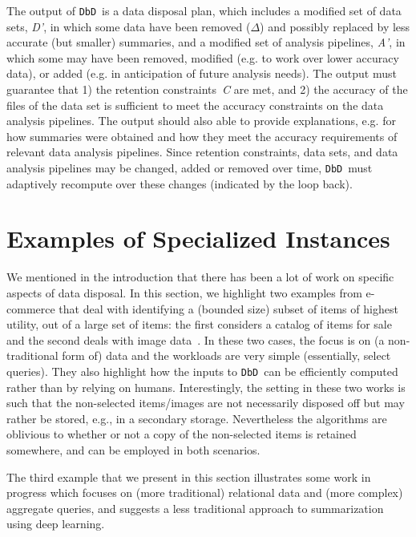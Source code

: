 \documentclass[11pt,dvipdfm]{article}
\newcommand{\grid}{{\tt DbD}}
\begin{document}
The output of \grid\ is a 
data disposal plan, which includes 
a modified set of data sets, \textit{D'}, in which some data have been removed ($\Delta$) and possibly replaced by less accurate (but smaller) summaries, and a modified set of analysis pipelines, 
\textit{A'}, in which some may have been removed,  modified (e.g. to work over lower accuracy data), or added (e.g. in anticipation of future analysis needs).  The output must guarantee that 1) the retention constraints~\textit{C} are met, and 2) the accuracy of the files of the data set is sufficient to meet the accuracy constraints on the data analysis pipelines.  The output should also able to provide explanations, e.g. for how summaries were obtained and how they meet the accuracy requirements of relevant data analysis pipelines. Since retention constraints, data sets, and data analysis pipelines may be changed, added or removed over time, \grid\ must adaptively recompute over these changes (indicated by the loop back).




\section{Examples of Specialized Instances}
\label{sec: ex}

We mentioned in the introduction that there has been a lot of work on specific aspects of data disposal.  In this section, we highlight two examples from e-commerce that deal with identifying a (bounded size) subset of items of highest utility, out of a large set of items: the first considers a catalog of items for sale~\cite{EDBT20} and the second deals with image data~\cite{SIGMOD-demo}.  In these two cases, the focus is on (a non-traditional form of) data and the workloads are very simple (essentially, select queries).  They also highlight how the inputs to \grid\ can be efficiently computed rather than by relying on humans. Interestingly, the setting in these two works is such that the non-selected items/images are not necessarily disposed off but may rather be stored, e.g., in a secondary storage. Nevertheless the algorithms are oblivious to whether or not a copy of the non-selected items is retained somewhere, and can be employed in both scenarios.


The third example that we present in this section illustrates some work in progress which focuses on (more traditional) relational data and (more complex) aggregate queries, and suggests a less traditional approach to summarization using deep learning.  
\end{document}
